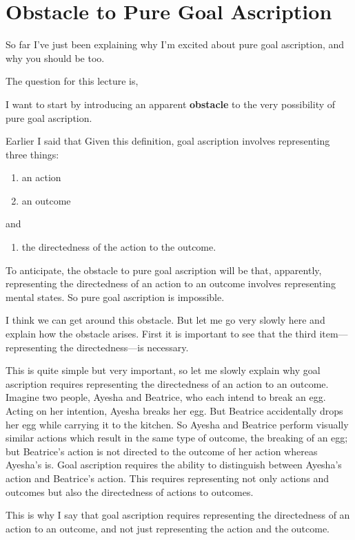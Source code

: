 \documentclass[12pt,\papersize]{extarticle}
\begin{document}
\section{Obstacle to Pure Goal Ascription}
So far I've just been explaining why I'm excited about pure goal ascription, and why you should be too.

The question for this lecture is, 
\theQuestion

I want to start by introducing an apparent \textbf{obstacle} to the very possibility of pure goal ascription.

Earlier I said that \dfGoalAscription{}
Given this definition,
 goal ascription involves representing three things:
\begin{enumerate}
\item an action
\item an outcome
\end{enumerate}
and
\begin{enumerate}[resume]
\item the directedness of the action to the outcome.
\end{enumerate}
%
To anticipate, 
the obstacle to pure goal ascription will be that, apparently, representing the directedness of an action to an outcome involves representing mental states.
So pure goal ascription is impossible.

I think we can get around this obstacle.  
But let me go very slowly here and explain how the obstacle arises.
First it is important to see that the third item---representing the directedness---is necessary.

This is quite simple but very important, so let me slowly explain why goal ascription requires representing the directedness of an action to an outcome.
Imagine two people, Ayesha and Beatrice, who each intend to break an egg.
Acting on her intention, Ayesha breaks her egg.
But Beatrice accidentally drops her egg while carrying it to the kitchen.
So Ayesha and Beatrice perform visually similar actions which result in the same type of outcome, the breaking of an egg; 
	but Beatrice's action is not directed to the outcome of her action whereas Ayesha's is.
Goal ascription requires the ability to distinguish between Ayesha's action and Beatrice's action. 
This requires representing not only actions and outcomes but also the directedness of actions to outcomes.

This is why I say that goal ascription requires representing the directedness of an action to an outcome, and not just representing the action and the outcome.
\end{document}
